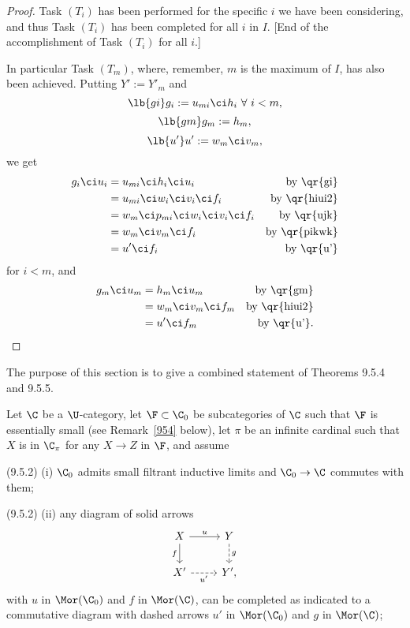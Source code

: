 \documentclass[12pt]{article}
\theoremstyle{remark}
\theoremstyle{definition}
\begin{document}
\begin{proof}
Task $(T_i)$ has been performed for the specific $i$ we have been considering, and thus Task $(T_i)$ has been completed for all $i$ in $I$. [End of the accomplishment of Task $(T_i)$ for all $i$.]

In particular Task $(T_m)$, where, remember, $m$ is the maximum of $I$, has also been achieved. Putting $Y':=Y'_m$ and 
%
\begin{equation}\lb{gi}
g_i:=u_{mi}\ci h_i\ \forall\ i<m,
\end{equation}
%
\begin{equation}\lb{gm}
g_m:=h_m,
\end{equation}
%
\begin{equation}\lb{u'}
u':=w_m\ci v_m,
\end{equation}
%
we get
% 
\begin{align*}
g_i\ci u_i&=u_{mi}\ci h_i\ci u_i&\text{by \qr{gi}}\\ 
&=u_{mi}\ci w_i\ci v_i\ci f_i&\text{by \qr{hiui2}}\\ 
&=w_m\ci p_{mi}\ci w_i\ci v_i\ci f_i&\text{by \qr{ujk}}\\ 
&=w_m\ci v_m\ci f_i&\text{by \qr{pikwk}}\\ 
&=u'\ci f_i&\text{by \qr{u'}}
\end{align*}
%
for $i<m$, and 
% 
\begin{align*}
g_m\ci u_m&=h_m\ci u_m&\text{by \qr{gm}}\\ 
&=w_m\ci v_m\ci f_m&\text{by \qr{hiui2}}\\ 
&=u'\ci f_m&\text{by \qr{u'}}.
\end{align*}
%
\end{proof}



The purpose of this section is to give a combined statement of Theorems 9.5.4 and 9.5.5. 

Let $\C$ be a $\U$-category, let $\F\subset\C_0$ be subcategories of $\C$ such that $\F$ is essentially small (see Remark~\ref{954} below), let $\pi$ be an infinite cardinal such that $X$ is in $\C_\pi$ for any $X\to Z$ in $\F$, and assume 

\nn(9.5.2) (i) $\C_0$ admits small filtrant inductive limits and $\C_0\to\C$ commutes with them;

\nn(9.5.2) (ii) any diagram of solid arrows
$$
\begin{tikzcd}
X\ar{d}[swap]{f}\ar{r}{u}&Y\ar[dashed]{d}{g}\\ 
X'\ar[dashed]{r}[swap]{u'}&Y',
\end{tikzcd}
$$ 
with $u$ in $\Mor(\C_0)$ and $f$ in $\Mor(\C)$, can be completed as indicated to a commutative diagram with dashed arrows $u'$ in $\Mor(\C_0)$ and $g$ in $\Mor(\C)$; 
\end{document}
